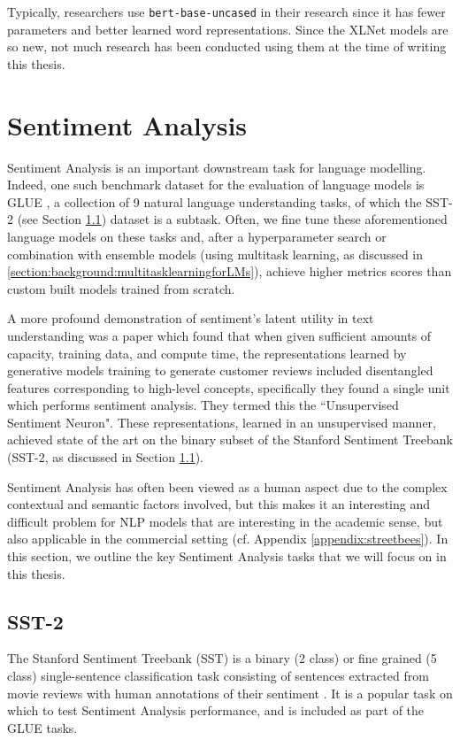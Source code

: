 {{Typically, researchers use \texttt{bert-base-uncased} in their research since it has fewer parameters and better learned word representations. Since the XLNet models are so new, not much research has been conducted using them at the time of writing this thesis.

\section{Sentiment Analysis}
Sentiment Analysis is an important downstream task for language modelling. Indeed, one such benchmark dataset for the evaluation of language models is GLUE \cite{Wang2018}, a collection of 9 natural language understanding tasks,  of which the SST-2 (see Section \ref{section:background:sst2})  dataset is a subtask. Often, we fine tune these aforementioned language models on these tasks and, after a hyperparameter search or combination with ensemble models (using multitask learning, as discussed in \ref{section:background:multitasklearningforLMs}), achieve higher metrics scores than custom built models trained from scratch.

A more profound demonstration of sentiment's latent utility in text understanding was a paper \cite{Radford2017} which found that when given sufficient amounts of capacity, training data, and compute time, the representations learned by generative models training to generate customer reviews included disentangled features corresponding to high-level concepts, specifically they found a single unit which performs sentiment analysis. They termed this the ``Unsupervised Sentiment Neuron". These representations, learned in an unsupervised manner, achieved state of the art on the binary subset of the Stanford Sentiment Treebank (SST-2, as discussed in Section \ref{section:background:sst2}).

Sentiment Analysis has often been viewed as a human aspect due to the complex contextual and semantic factors involved, but this makes it an interesting and difficult problem for NLP models that are interesting in the academic sense, but also applicable in the commercial setting (cf. Appendix \ref{appendix:streetbees}). In this section, we outline the key Sentiment Analysis tasks that we will focus on in this thesis.

\subsection{SST-2} \label{section:background:sst2}
The Stanford Sentiment Treebank (SST) is a binary (2 class) or fine grained (5 class) single-sentence classification task consisting of sentences extracted from movie reviews with human annotations of their sentiment \cite{Socher}. It is a popular task on which to test Sentiment Analysis performance, and is included as part of the GLUE tasks.

}}
